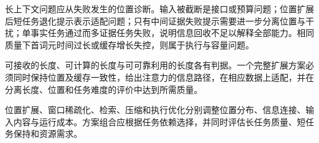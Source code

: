 \documentclass[../textbook.tex]{subfiles}
\begin{document}
长上下文问题应从失败发生的位置诊断。输入被截断是接口或预算问题；位置扩展后短任务退化提示表示适配问题；只有中间证据失败提示需要进一步分离位置与干扰；单事实任务通过而多证据任务失败，说明信息回收不足以解释全部能力。相同质量下首词元时间过长或缓存增长失控，则属于执行与容量问题。

\begin{note}[有效长上下文是联合约束]
可接收的长度、可计算的长度与可可靠利用的长度各有判据。一个完整扩展方案必须同时保持位置及缓存一致性，给出注意力的信息路径，在相应数据上适配，并在分离长度、位置和任务难度的评价中达到所需质量。
\end{note}

位置扩展、窗口稀疏化、检索、压缩和执行优化分别调整位置分布、信息连接、输入内容与运行成本。方案组合应根据任务依赖选择，并同时评估长任务质量、短任务保持和资源需求。






\chapterreferences
\myendchapterdocument
\end{document}
